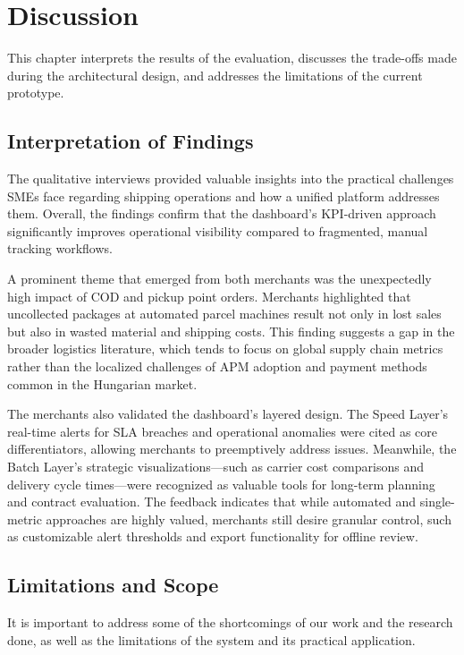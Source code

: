\documentclass{imc-inf}
\begin{document}
\chapter{Discussion}
\label{ch:discussion}

This chapter interprets the results of the evaluation, discusses the trade-offs made during the architectural design, and addresses the limitations of the current prototype.

\section{Interpretation of Findings}
The qualitative interviews provided valuable insights into the practical challenges SMEs face regarding shipping operations and how a unified platform addresses them.
Overall, the findings confirm that the dashboard's KPI-driven approach significantly improves operational visibility compared to fragmented, manual tracking workflows.

A prominent theme that emerged from both merchants was the unexpectedly high impact of COD and pickup point orders.
Merchants highlighted that uncollected packages at automated parcel machines result not only in lost sales but also in wasted material and shipping costs.
This finding suggests a gap in the broader logistics literature, which tends to focus on global supply chain metrics rather than the localized challenges of APM adoption and payment methods common in the Hungarian market.

The merchants also validated the dashboard's layered design.
The Speed Layer's real-time alerts for SLA breaches and operational anomalies were cited as core differentiators, allowing merchants to preemptively address issues.
Meanwhile, the Batch Layer's strategic visualizations—such as carrier cost comparisons and delivery cycle times—were recognized as valuable tools for long-term planning and contract evaluation.
The feedback indicates that while automated and single-metric approaches are highly valued, merchants still desire granular control, such as customizable alert thresholds and export functionality for offline review.

\section{Limitations and Scope}
It is important to address some of the shortcomings of our work and the research done, as well as the limitations of the system and its practical application.
\end{document}
